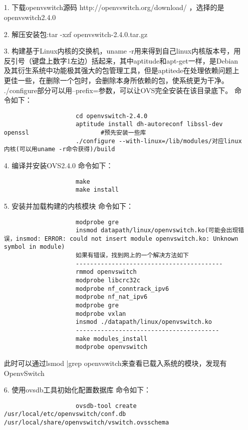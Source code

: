 \documentclass[a4paper,left=1.5cm,right=1.5cm,11pt]{article}
\begin{document}
\tableofcontents

\clearpage

\subsection{}
	\begin{itemize}
        \item[1.]下载openvswitch源码 http://openvswitch.org/download/ ，选择的是openvswitch2.4.0
		\item[2.]解压安装包:tar -xzf openvswitch-2.4.0.tar.gz
		\item[3.]构建基于Linux内核的交换机，uname -r用来得到自己linux内核版本号，用反引号（键盘上数字1左边）括起来，其中aptitude和apt-get一样，是Debian及其衍生系统中功能极其强大的包管理工具，但是aptitede在处理依赖问题上更佳一些，在删除一个包时，会删除本身所依赖的包，使系统更为干净。
                 ./configure部分可以用--prefix=参数，可以让OVS完全安装在该目录底下。
				 命令如下：
				 \begin{lstlisting}
					cd openvswitch-2.4.0
					aptitude install dh-autoreconf libssl-dev openssl                    #预先安装一些库
					./configure --with-linux=/lib/modules/对应linux内核(可以用uname -r命令获得)/build
				 \end{lstlisting}
		\item[4.]编译并安装OVS2.4.0
		         命令如下：
				 \begin{lstlisting}
					make
					make install
				 \end{lstlisting}
		\item[5.]安装并加载构建的内核模块
				 命令如下：
				 \begin{lstlisting}
					modprobe gre
					insmod datapath/linux/openvswitch.ko(可能会出现错误，insmod: ERROR: could not insert module openvswitch.ko: Unknown symbol in module)
					如果有错误，找到网上的一个解决方法如下
					-----------------------------------------
					rmmod openvswitch
					modprobe libcrc32c
					modprobe nf_conntrack_ipv6
					modprobe nf_nat_ipv6
					modprobe gre
					modprobe vxlan
					insmod ./datapath/linux/openvswitch.ko
					----------------------------------------
					make modules_install
					modprobe openvswitch
				 \end{lstlisting}
				 此时可以通过lsmod |grep openvswitch来查看已载入系统的模块，发现有OpenvSwitch
		\item[6.]使用ovsdb工具初始化配置数据库
				命令如下：
				 \begin{lstlisting}
					ovsdb-tool create /usr/local/etc/openvswitch/conf.db /usr/local/share/openvswitch/vswitch.ovsschema

\end{lstlisting}
\end{itemize}
\end{document}
